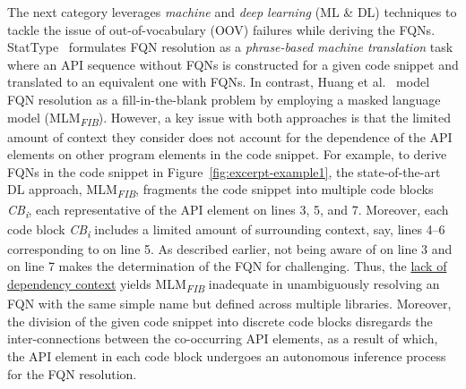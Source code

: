The next category leverages {\em machine} and {\em deep learning} (ML \& DL) techniques to tackle the issue of out-of-vocabulary (OOV) failures while deriving the FQNs.
StatType~\cite{icse18} formulates FQN resolution as a {\em phrase-based machine translation} task where an API sequence without FQNs is constructed for a given code snippet and translated to an equivalent one with FQNs.
In contrast, Huang et al.~\cite{prompt-ase22} model FQN resolution as a fill-in-the-blank problem by employing a masked language model (MLM\textsubscript{\textit{FIB}}).
However, a key issue with both approaches is that the limited amount of context they consider does not account for the dependence of the API elements on other program elements in the code snippet. For example, to derive FQNs in the code snippet in Figure~\ref{fig:excerpt-example1}, the state-of-the-art DL approach, MLM\textsubscript{\textit{FIB}}, fragments the code snippet into multiple code blocks \textit{CB\textsubscript{i}}, each representative of the API element on lines 3, 5, and 7. Moreover, each code block \textit{CB\textsubscript{i}} includes a limited amount of surrounding context, say, lines 4--6 corresponding to  on line 5. As described earlier, not being aware of  on line 3 and  on line 7 makes the determination of the FQN for  challenging. Thus, the \underline{lack of dependency context} yields MLM\textsubscript{\textit{FIB}} inadequate in unambiguously resolving an FQN with the same simple name but defined across multiple libraries. 
Moreover, the division of the given code snippet into discrete code blocks disregards the inter-connections between the co-occurring API elements, as a result of which, the API element in each code block undergoes an autonomous inference process for the FQN resolution.

